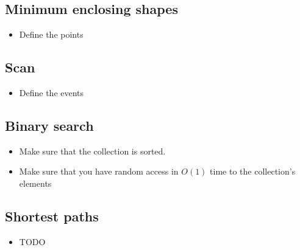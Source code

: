 \documentclass[guide.tex]{subfiles}
\begin{document}
\subsection{Minimum enclosing shapes}
\begin{itemize}
  \item Define the points
\end{itemize}

\subsection{Scan}
\begin{itemize}
  \item Define the events
\end{itemize}

\subsection{Binary search}
\begin{itemize}
  \item Make sure that the collection is sorted.
  \item Make sure that you have random access in $O(1)$ time to the collection's elements
\end{itemize}

\subsection{Shortest paths}
\begin{itemize}
  \item TODO
\end{itemize}
\end{document}
